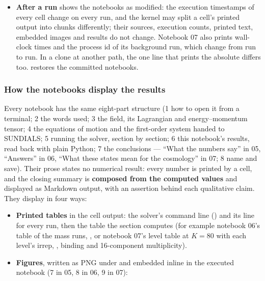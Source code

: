 \begin{itemize}
  \item \textbf{After a run}  shows the notebooks as modified: the execution timestamps of every cell change on every run, and the kernel may split a cell's printed output into chunks differently; their sources, execution counts, printed text, embedded images and results do not change. Notebook 07 also prints wall-clock times and the process id of its background run, which change from run to run. In a clone at another path, the one line that prints the absolute  differs too.  restores the committed notebooks.
\end{itemize}

\subsubsection{How the notebooks display the results}
\label{sec:6.7.3}

Every notebook has the same eight-part structure (1 how to open it from a terminal; 2 the words used; 3 the field, its Lagrangian and energy--momentum tensor; 4 the equations of motion and the first-order system handed to SUNDIALS; 5 running the solver, section by section; 6 this notebook's results, read back with plain Python; 7 the conclusions --- ``What the numbers say'' in 05, ``Answers'' in 06, ``What these states mean for the cosmology'' in 07; 8 name and save). Their prose states no numerical result: every number is printed by a cell, and the closing summary is \textbf{composed from the computed values} and displayed as Markdown output, with an assertion behind each qualitative claim. They display in four ways:

\begin{itemize}
  \item \textbf{Printed tables} in the cell output: the solver's command line () and its  line for every run, then the table the section computes (for example notebook 06's table of the mass runs, , or notebook 07's level table at $K = 80$ with each level's irrep, , binding and 16-component multiplicity).
  \item \textbf{Figures}, written as PNG under  and embedded inline in the executed notebook (7 in 05, 8 in 06, 9 in 07):
\end{itemize}

